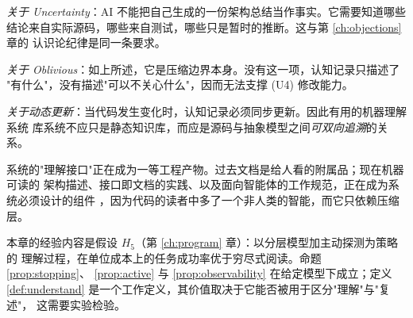 \emph{关于 Uncertainty}：AI 不能把自己生成的一份架构总结当作事实。它需要知道哪些
结论来自实际源码，哪些来自测试，哪些只是暂时的推断。这与第 \ref{ch:objections} 章的
认识论纪律是同一条要求。

\emph{关于 Oblivious}：如上所述，它是压缩边界本身。没有这一项，认知记录只描述了
"有什么"，没有描述"可以不关心什么"，因而无法支撑 (U4) 修改能力。

\emph{关于动态更新}：当代码发生变化时，认知记录必须同步更新。因此有用的机器理解系统
库系统不应只是静态知识库，而应是源码与抽象模型之间\emph{可双向追溯}的关系。

\begin{principle}[可读性从美德变为基础设施]\label{pr:readability}
系统的"理解接口"正在成为一等工程产物。过去文档是给人看的附属品；现在机器可读的
架构描述、接口即文档的实践、以及面向智能体的工作规范，正在成为系统必须设计的组件
，因为代码的读者中多了一个非人类的智能，而它只依赖压缩层。
\end{principle}

本章的经验内容是假设 $H_5$（第 \ref{ch:program} 章）：以分层模型加主动探测为策略的
理解过程，在单位成本上的任务成功率优于穷尽式阅读。命题 \ref{prop:stopping}、
\ref{prop:active} 与 \ref{prop:observability} 在给定模型下成立；定义
\ref{def:understand} 是一个工作定义，其价值取决于它能否被用于区分"理解"与"复述"，
这需要实验检验。

